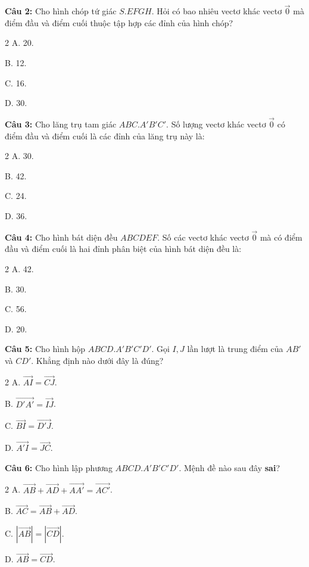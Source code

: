 \documentclass[12pt]{article}
\begin{document}
	\vspace{0.2cm}
	\noindent \textbf{Câu 2:} Cho hình chóp tứ giác $S.EFGH$. Hỏi có bao nhiêu vectơ khác vectơ $\vec{0}$ mà điểm đầu và điểm cuối thuộc tập hợp các đỉnh của hình chóp?
	\begin{multicols}{2}
		A. 20. \par
		B. 12. \par
		C. 16. \par
		D. 30.
	\end{multicols}
	
	\vspace{0.2cm}
	\noindent \textbf{Câu 3:} Cho lăng trụ tam giác $ABC.A'B'C'$. Số lượng vectơ khác vectơ $\vec{0}$ có điểm đầu và điểm cuối là các đỉnh của lăng trụ này là:
	\begin{multicols}{2}
		A. 30. \par
		B. 42. \par
		C. 24. \par
		D. 36.
	\end{multicols}
	
	\vspace{0.2cm}
	\noindent \textbf{Câu 4:} Cho hình bát diện đều $ABCDEF$. Số các vectơ khác vectơ $\vec{0}$ mà có điểm đầu và điểm cuối là hai đỉnh phân biệt của hình bát diện đều là:
	\begin{multicols}{2}
		A. 42. \par
		B. 30. \par
		C. 56. \par
		D. 20.
	\end{multicols}
	
	\noindent\textbf{Câu 5:} Cho hình hộp $ABCD.A'B'C'D'$. Gọi $I, J$ lần lượt là trung điểm của $AB'$ và $CD'$. Khẳng định nào dưới đây là đúng?
	\begin{multicols}{2}
		A. $\overrightarrow{AI} = \overrightarrow{CJ}$. \par
		B. $\overrightarrow{D'A'} = \overrightarrow{IJ}$. \par
		C. $\overrightarrow{BI} = \overrightarrow{D'J}$. \par
		D. $\overrightarrow{A'I} = \overrightarrow{JC}$.
	\end{multicols}
	
	\vspace{0.2cm}
	\noindent\textbf{Câu 6:} Cho hình lập phương $ABCD.A'B'C'D'$. Mệnh đề nào sau đây \textbf{sai}?
	\begin{multicols}{2}
		A. $\overrightarrow{AB} + \overrightarrow{AD} + \overrightarrow{AA'} = \overrightarrow{AC'}$. \par
		B. $\overrightarrow{AC} = \overrightarrow{AB} + \overrightarrow{AD}$. \par
		C. $|\overrightarrow{AB}| = |\overrightarrow{CD}|$. \par
		D. $\overrightarrow{AB} = \overrightarrow{CD}$.
	\end{multicols}
	
\end{document}
